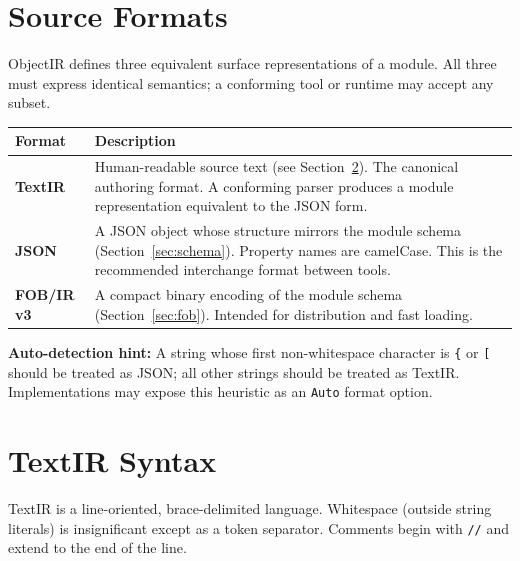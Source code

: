 \documentclass[11pt,a4paper]{article}
\newcommand{\term}[1]{\texttt{#1}}
\begin{document}
\section{Source Formats}
\label{sec:formats}

ObjectIR defines three equivalent surface representations of a module. All
three must express identical semantics; a conforming tool or runtime may
accept any subset.

\begin{longtable}{lp{10cm}}
  \toprule
  \textbf{Format} & \textbf{Description} \\
  \midrule
  \endhead
  \textbf{TextIR}    &
    Human-readable source text (see Section~\ref{sec:textir}).
    The canonical authoring format. A conforming parser produces a module
    representation equivalent to the JSON form. \\[0.4em]
  \textbf{JSON}      &
    A JSON object whose structure mirrors the module schema
    (Section~\ref{sec:schema}). Property names are camelCase.
    This is the recommended interchange format between tools. \\[0.4em]
  \textbf{FOB/IR v3} &
    A compact binary encoding of the module schema
    (Section~\ref{sec:fob}). Intended for distribution and fast loading. \\
  \bottomrule
\end{longtable}

\begin{notebox}
\textbf{Auto-detection hint:} A string whose first non-whitespace character
is \texttt{\{} or \texttt{[} should be treated as JSON; all other strings
should be treated as TextIR. Implementations may expose this heuristic as
an \texttt{Auto} format option.
\end{notebox}

\section{TextIR Syntax}
\label{sec:textir}

TextIR is a line-oriented, brace-delimited language. Whitespace (outside
string literals) is insignificant except as a token separator. Comments
begin with \term{//} and extend to the end of the line.
\end{document}

